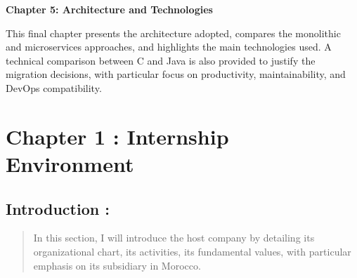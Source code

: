 \documentclass[12pt,a4paper]{report}
\begin{document}
\textbf{Chapter 5: Architecture and Technologies}

This final chapter presents the architecture adopted, compares the monolithic and microservices approaches, and highlights the main technologies used. A technical comparison between C and Java is also provided to justify the migration decisions, with particular focus on productivity, maintainability, and DevOps compatibility.



\clearpage

\section{Chapter 1 : Internship Environment}

\subsection{Introduction :}
\begin{quote}
In this section, I will introduce the host company by detailing its
organizational chart, its activities, its fundamental values, with
particular emphasis on its subsidiary in Morocco.
\end{quote}
\end{document}
